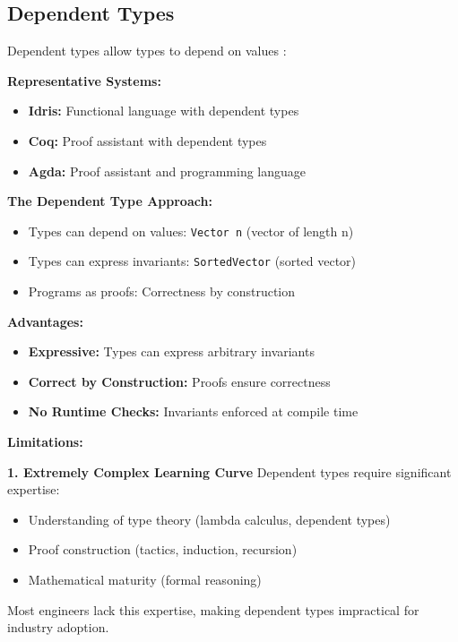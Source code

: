 \subsection{Dependent Types}

Dependent types allow types to depend on values \cite{pierce2002types}:

\textbf{Representative Systems:}
\begin{itemize}
    \item \textbf{Idris:} Functional language with dependent types
    \item \textbf{Coq:} Proof assistant with dependent types
    \item \textbf{Agda:} Proof assistant and programming language
\end{itemize}

\textbf{The Dependent Type Approach:}
\begin{itemize}
    \item Types can depend on values: \texttt{Vector n} (vector of length n)
    \item Types can express invariants: \texttt{SortedVector} (sorted vector)
    \item Programs as proofs: Correctness by construction
\end{itemize}

\textbf{Advantages:}
\begin{itemize}
    \item \textbf{Expressive:} Types can express arbitrary invariants
    \item \textbf{Correct by Construction:} Proofs ensure correctness
    \item \textbf{No Runtime Checks:} Invariants enforced at compile time
\end{itemize}

\textbf{Limitations:}

\textbf{1. Extremely Complex Learning Curve}
Dependent types require significant expertise:
\begin{itemize}
    \item Understanding of type theory (lambda calculus, dependent types)
    \item Proof construction (tactics, induction, recursion)
    \item Mathematical maturity (formal reasoning)
\end{itemize}

Most engineers lack this expertise, making dependent types impractical for industry adoption.


